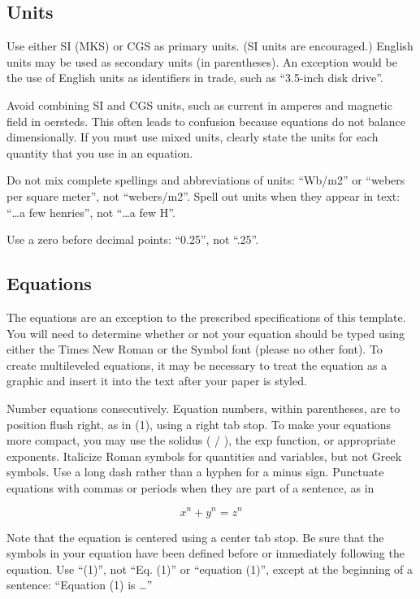 \documentclass[conference,pbalance]{iaria}
\begin{document}
\subsection{Units}
\begin{compactitem}
\item Use either SI (MKS) or CGS as primary units. (SI units are encouraged.) English units may be used as secondary units (in parentheses). An exception would be the use of English units as identifiers in trade, such as “3.5-inch disk drive”.
\item Avoid combining SI and CGS units, such as current in amperes and magnetic field in oersteds. This often leads to confusion because equations do not balance dimensionally. If you must use mixed units, clearly state the units for each quantity that you use in an equation.
\item Do not mix complete spellings and abbreviations of units: “Wb/m2” or “webers per square meter”, not “webers/m2”.  Spell out units when they appear in text: “\ldots a few henries”, not “\ldots a few H”.
\item Use a zero before decimal points: “0.25”, not “.25”.
\end{compactitem}

\subsection{Equations}

The equations are an exception to the prescribed specifications of this template. You will need to determine whether or not your equation should be typed using either the Times New Roman or the Symbol font (please no other font). To create multileveled equations, it may be necessary to treat the equation as a graphic and insert it into the text after your paper is styled.

Number equations consecutively. Equation numbers, within parentheses, are to position flush right, as in (1), using a right tab stop. To make your equations more compact, you may use the solidus ( / ), the exp function, or appropriate exponents. Italicize Roman symbols for quantities and variables, but not Greek symbols. Use a long dash rather than a hyphen for a minus sign. Punctuate equations with commas or periods when they are part of a sentence, as in

\[ x^n + y^n = z^n \]

Note that the equation is centered using a center tab stop. Be sure that the symbols in your equation have been defined before or immediately following the equation. Use “(1)”, not “Eq. (1)” or “equation (1)”, except at the beginning of a sentence: “Equation (1) is \ldots”
\end{document}
